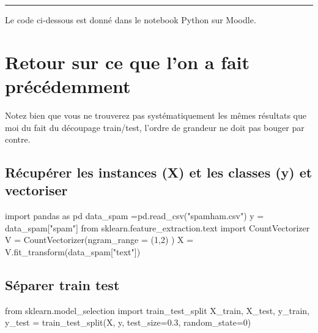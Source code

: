 
\newcommand{\numTD}{TD6}
\newcommand{\themeTD}{Aller plus loin avec \textsc{SciKitlearn}}



\hrule

\noindent{}
\vspace{.5cm}

Le code ci-dessous est donné dans le notebook Python sur Moodle.

\section{Retour sur ce que l'on a fait précédemment}

Notez bien que vous ne trouverez pas systématiquement les mêmes résultats que moi du fait du découpage train/test, l'ordre de grandeur ne doit pas bouger par contre.

 \subsection*{Récupérer les instances (X) et les classes (y) et vectoriser}

\begin{python}
import pandas as pd
data_spam =pd.read_csv("spamham.csv")
y = data_spam["spam"]
from sklearn.feature_extraction.text import CountVectorizer
V = CountVectorizer(ngram_range = (1,2) )
X = V.fit_transform(data_spam["text"])
\end{python}


\subsection*{Séparer train test}
\begin{python}
from sklearn.model_selection import train_test_split
X_train, X_test, y_train, y_test = train_test_split(X, y, test_size=0.3, random_state=0)
\end{python}

